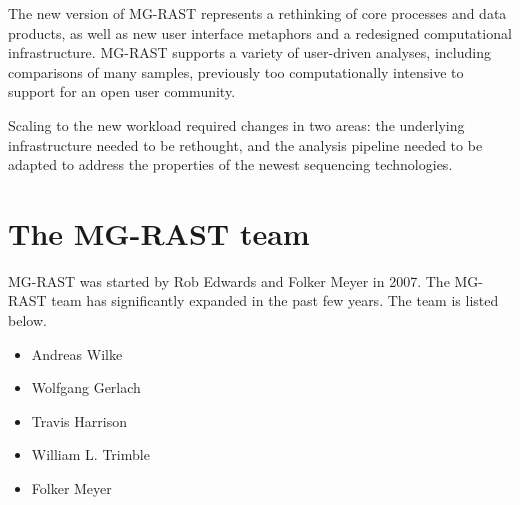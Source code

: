 \documentclass[letterpaper,10pt,english]{sphinxmanual}
\begin{document}
The new version of MG-RAST represents a rethinking of core processes and
data products, as well as new user interface metaphors and a redesigned
computational infrastructure. MG-RAST supports a variety of user-driven
analyses, including comparisons of many samples, previously too
computationally intensive to support for an open user community.

Scaling to the new workload required changes in two areas: the
underlying infrastructure needed to be rethought, and the analysis
pipeline needed to be adapted to address the properties of the newest
sequencing technologies.


\section{The MG-RAST team}
\label{\detokenize{user_manual:the-mg-rast-team}}
MG-RAST was started by Rob Edwards and Folker Meyer in 2007. The MG-RAST
team has significantly expanded in the past few years. The team is
listed below.
\begin{itemize}
\item {} 
Andreas Wilke

\item {} 
Wolfgang Gerlach

\item {} 
Travis Harrison

\item {} 
William L. Trimble

\item {} 
Folker Meyer

\end{itemize}
\end{document}
